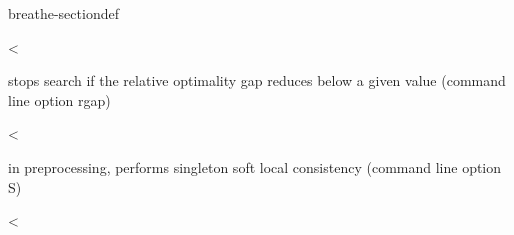 \documentclass[letterpaper,10pt,openany,oneside,english]{sphinxmanual}
\begin{document}
\begin{fulllineitems}
\begin{sphinxuseclass}{breathe-sectiondef}
\begin{fulllineitems}
\label{\detokenize{ref/ref_cpp:_CPPv4N8ToulBar220singletonConsistencyE}}\label{\detokenize{ref/ref_cpp:_CPPv3N8ToulBar220singletonConsistencyE}}\label{\detokenize{ref/ref_cpp:_CPPv2N8ToulBar220singletonConsistencyE}}\label{\detokenize{ref/ref_cpp:ToulBar2::singletonConsistency__b}}
\pysigstartsignatures
\pysigstartmultiline
{}
\pysigstopmultiline
\pysigstopsignatures
\sphinxAtStartPar
\textless{} 

\sphinxAtStartPar
stops search if the relative optimality gap reduces below a given value (command line option \sphinxhyphen{}rgap) 

\end{fulllineitems}


\begin{fulllineitems}
\label{\detokenize{ref/ref_cpp:_CPPv4N8ToulBar217vacValueHeuristicE}}\label{\detokenize{ref/ref_cpp:_CPPv3N8ToulBar217vacValueHeuristicE}}\label{\detokenize{ref/ref_cpp:_CPPv2N8ToulBar217vacValueHeuristicE}}\label{\detokenize{ref/ref_cpp:ToulBar2::vacValueHeuristic__b}}
\pysigstartsignatures
\pysigstartmultiline
{}
\pysigstopmultiline
\pysigstopsignatures
\sphinxAtStartPar
\textless{} 

\sphinxAtStartPar
in preprocessing, performs singleton soft local consistency (command line option \sphinxhyphen{}S) 

\end{fulllineitems}


\begin{fulllineitems}
\label{\detokenize{ref/ref_cpp:_CPPv4N8ToulBar23bepE}}\label{\detokenize{ref/ref_cpp:_CPPv3N8ToulBar23bepE}}\label{\detokenize{ref/ref_cpp:_CPPv2N8ToulBar23bepE}}\label{\detokenize{ref/ref_cpp:ToulBar2::bep__BEPP}}
\pysigstartsignatures
\pysigstartmultiline
{}
\pysigstopmultiline
\pysigstopsignatures
\sphinxAtStartPar
\textless{} 


\end{fulllineitems}
\end{sphinxuseclass}
\end{fulllineitems}
\end{document}
